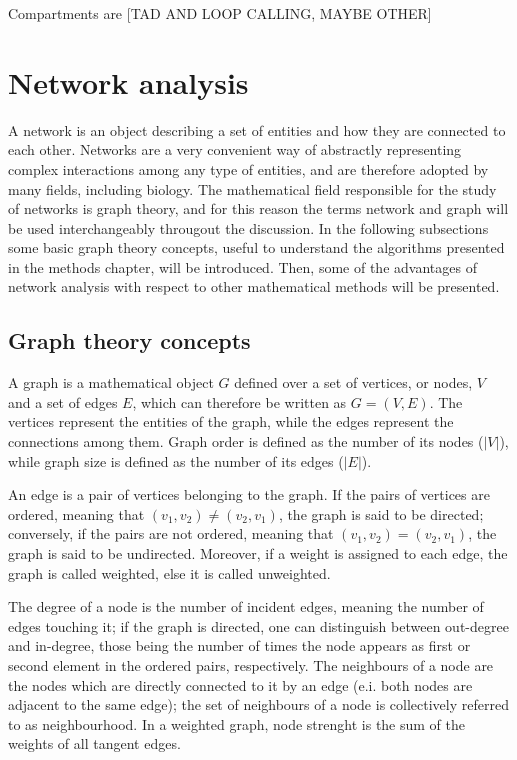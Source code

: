 Compartments are 
[TAD AND LOOP CALLING, MAYBE OTHER]


\section{Network analysis}

A network is an object describing a set of entities and how they are connected to each other. Networks are a very convenient way of abstractly representing complex interactions among any type of entities, and are therefore adopted by many fields, including biology. The mathematical field responsible for the study of networks is graph theory, and for this reason the terms network and graph will be used interchangeably througout the discussion. In the following subsections some basic graph theory concepts, useful to understand the algorithms presented in the methods chapter, will be introduced. Then, some of the advantages of network analysis with respect to other mathematical methods will be presented.


\subsection{Graph theory concepts}
A graph is a mathematical object $G$ defined over a set of vertices, or nodes, $V$ and a set of edges $E$, which can therefore be written as $G=(V,E)$. The vertices represent the entities of the graph, while the edges represent the connections among them. Graph order is defined as the number of its nodes ($|V|$), while graph size is defined as the number of its edges ($|E|$).

An edge is a pair of vertices belonging to the graph. If the pairs of vertices are ordered, meaning that $(v_1,v_2) \neq (v_2, v_1)$, the graph is said to be directed; conversely, if the pairs are not ordered, meaning that $(v_1,v_2) = (v_2, v_1)$, the graph is said to be undirected. Moreover, if a weight is assigned to each edge, the graph is called weighted, else it is called unweighted.

The degree of a node is the number of incident edges, meaning the number of edges touching it; if the graph is directed, one can distinguish between out-degree and in-degree, those being the number of times the node appears as first or second element in the ordered pairs, respectively. The neighbours of a node are the nodes which are directly connected to it by an edge (e.i. both nodes are adjacent to the same edge); the set of neighbours of a node is collectively referred to as neighbourhood. In a weighted graph, node strenght is the sum of the weights of all tangent edges. 

